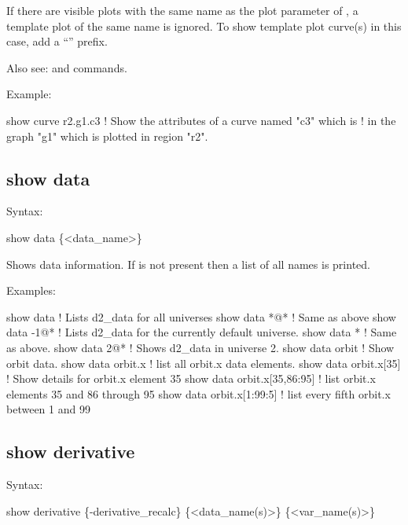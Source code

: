 {{{{{{{{If there are visible plots with the same name as the plot parameter of , a template plot
of the same name is ignored. To show template plot curve(s) in this case, add a ``'' prefix.

Also see:  and  commands.

Example:
\begin{example}
  show curve r2.g1.c3     ! Show the attributes of a curve named "c3" which is 
                          !   in the graph "g1" which is plotted in region "r2".
\end{example}


\subsection{show data}
\label{s:show.data}

Syntax:
\begin{example}
  show data \{<data_name>\}
\end{example}

Shows data information. If  is not present then a list of all  names is
printed.

Examples:
\begin{example}
  show data                   ! Lists d2_data for all universes
  show data *@*               ! Same as above
  show data -1@*              ! Lists d2_data for the currently default universe.
  show data *                 ! Same as above.
  show data 2@*               ! Shows d2_data in universe 2.
  show data orbit             ! Show orbit data.
  show data orbit.x           ! list all orbit.x data elements.
  show data orbit.x[35]       ! Show details for orbit.x element 35
  show data orbit.x[35,86:95] ! list orbit.x elements 35 and 86 through 95
  show data orbit.x[1:99:5]   ! list every fifth orbit.x between 1 and 99  
\end{example}


\subsection{show derivative}
\label{s:show.derivative}

Syntax:
\begin{example}
  show derivative \{-derivative_recalc\} \{<data_name(s)>\} \{<var_name(s)>\}
\end{example}

}}}}}}}}
